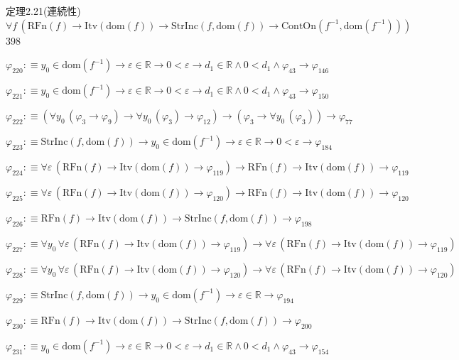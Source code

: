 \begin{fullproof}{定理2.21(連続性)}{$\forall f\,(\mathrm{RFn}(f) \to \mathrm{Itv}(\mathrm{dom}(f)) \to \mathrm{StrInc}(f,\mathrm{dom}(f)) \to \mathrm{ContOn}(f^{-1},\mathrm{dom}(f^{-1})))$}{398}
\begin{abbrevlist}
\item $\varphi_{220} :\equiv y_{0} \in \mathrm{dom}(f^{-1}) \to \varepsilon \in \mathbb{R} \to 0 < \varepsilon \to d_{1} \in \mathbb{R} \land 0 < d_{1} \land \varphi_{43} \to \varphi_{146}$
\item $\varphi_{221} :\equiv y_{0} \in \mathrm{dom}(f^{-1}) \to \varepsilon \in \mathbb{R} \to 0 < \varepsilon \to d_{1} \in \mathbb{R} \land 0 < d_{1} \land \varphi_{43} \to \varphi_{150}$
\item $\varphi_{222} :\equiv (\forall y_{0}\,(\varphi_{3} \to \varphi_{9}) \to \forall y_{0}\,(\varphi_{3}) \to \varphi_{12}) \to (\varphi_{3} \to \forall y_{0}\,(\varphi_{3})) \to \varphi_{77}$
\item $\varphi_{223} :\equiv \mathrm{StrInc}(f,\mathrm{dom}(f)) \to y_{0} \in \mathrm{dom}(f^{-1}) \to \varepsilon \in \mathbb{R} \to 0 < \varepsilon \to \varphi_{184}$
\item $\varphi_{224} :\equiv \forall \varepsilon\,(\mathrm{RFn}(f) \to \mathrm{Itv}(\mathrm{dom}(f)) \to \varphi_{119}) \to \mathrm{RFn}(f) \to \mathrm{Itv}(\mathrm{dom}(f)) \to \varphi_{119}$
\item $\varphi_{225} :\equiv \forall \varepsilon\,(\mathrm{RFn}(f) \to \mathrm{Itv}(\mathrm{dom}(f)) \to \varphi_{120}) \to \mathrm{RFn}(f) \to \mathrm{Itv}(\mathrm{dom}(f)) \to \varphi_{120}$
\item $\varphi_{226} :\equiv \mathrm{RFn}(f) \to \mathrm{Itv}(\mathrm{dom}(f)) \to \mathrm{StrInc}(f,\mathrm{dom}(f)) \to \varphi_{198}$
\item $\varphi_{227} :\equiv \forall y_{0}\,\forall \varepsilon\,(\mathrm{RFn}(f) \to \mathrm{Itv}(\mathrm{dom}(f)) \to \varphi_{119}) \to \forall \varepsilon\,(\mathrm{RFn}(f) \to \mathrm{Itv}(\mathrm{dom}(f)) \to \varphi_{119})$
\item $\varphi_{228} :\equiv \forall y_{0}\,\forall \varepsilon\,(\mathrm{RFn}(f) \to \mathrm{Itv}(\mathrm{dom}(f)) \to \varphi_{120}) \to \forall \varepsilon\,(\mathrm{RFn}(f) \to \mathrm{Itv}(\mathrm{dom}(f)) \to \varphi_{120})$
\item $\varphi_{229} :\equiv \mathrm{StrInc}(f,\mathrm{dom}(f)) \to y_{0} \in \mathrm{dom}(f^{-1}) \to \varepsilon \in \mathbb{R} \to \varphi_{194}$
\item $\varphi_{230} :\equiv \mathrm{RFn}(f) \to \mathrm{Itv}(\mathrm{dom}(f)) \to \mathrm{StrInc}(f,\mathrm{dom}(f)) \to \varphi_{200}$
\item $\varphi_{231} :\equiv y_{0} \in \mathrm{dom}(f^{-1}) \to \varepsilon \in \mathbb{R} \to 0 < \varepsilon \to d_{1} \in \mathbb{R} \land 0 < d_{1} \land \varphi_{43} \to \varphi_{154}$

\end{abbrevlist}
\end{fullproof}
